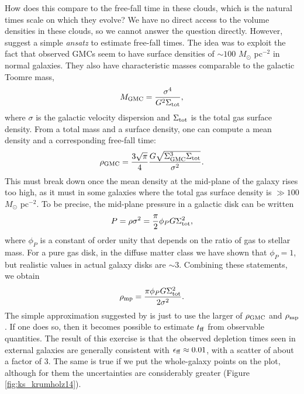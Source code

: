 How does this compare to the free-fall time in these clouds, which is the natural times scale on which they evolve? We have no direct access to the volume densities in these clouds, so we cannot answer the question directly. However, \citet{krumholz12a} suggest a simple \textit{ansatz} to estimate free-fall times. The idea was to exploit the fact that observed GMCs seem to have surface densities of $\sim 100$ $M_\odot$ pc$^{-2}$ in normal galaxies. They also have characteristic masses comparable to the galactic Toomre mass,
\begin{equation}
M_{\rm GMC} = \frac{\sigma^4}{G^2 \Sigma_{\rm tot}},
\end{equation}
where $\sigma$ is the galactic velocity dispersion and $\Sigma_{\rm tot}$ is the total gas surface density. From a total mass and a surface density, one can compute a mean density and a corresponding free-fall time:
\begin{equation}
\rho_{\rm GMC} = \frac{3\sqrt{\pi}}{4} \frac{G \sqrt{\Sigma_{\rm GMC}^3 \Sigma_{\rm tot}}}{\sigma^2}.
\end{equation}
This must break down once the mean density at the mid-plane of the galaxy rises too high, as it must in some galaxies where the total gas surface density is $\gg 100$ $M_\odot$ pc$^{-2}$. To be precise, the mid-plane pressure in a galactic disk can be written
\begin{equation}
P = \rho \sigma^2 = \frac{\pi}{2} \phi_P G \Sigma_{\rm tot}^2,
\end{equation}
where $\phi_P$ is a constant of order unity that depends on the ratio of gas to stellar mass. For a pure gas disk, in the diffuse matter class we have shown that $\phi_P = 1$, but realistic values in actual galaxy disks are $\sim 3$. Combining these statements, we obtain
\begin{equation}
\rho_{\rm mp} = \frac{\pi \phi_P G \Sigma_{\rm tot}^2}{2\sigma^2}.
\end{equation}
The simple approximation suggested by \citeauthor{krumholz12a} is just to use the larger of $\rho_{\rm GMC}$ and $\rho_{\rm mp}$. If one does so, then it becomes possible to estimate $t_{\rm ff}$ from observable quantities. The result of this exercise is that the observed depletion times seen in external galaxies are generally consistent with $\epsilon_{\rm ff} \approx 0.01$, with a scatter of about a factor of 3. The same is true if we put the whole-galaxy points on the plot, although for them the uncertainties are considerably greater (Figure \ref{fig:ks_krumholz14}).

